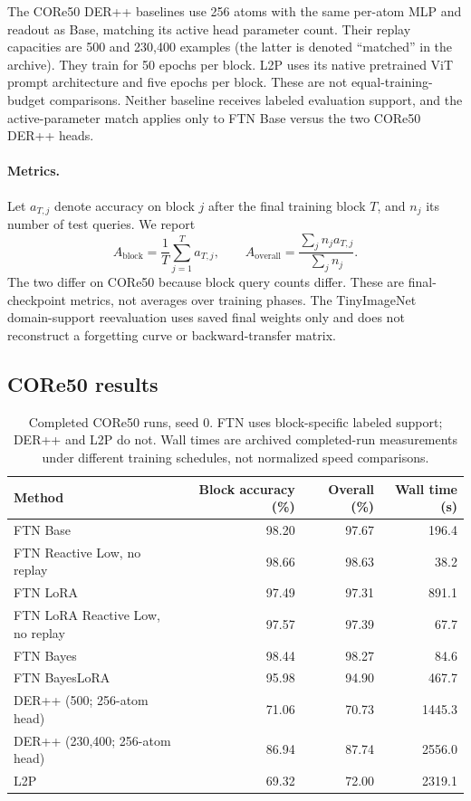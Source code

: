 The CORe50 DER++ baselines use 256 atoms with the same per-atom MLP and readout as Base, matching its active head parameter count. Their replay capacities are 500 and 230,400 examples (the latter is denoted ``matched'' in the archive). They train for 50 epochs per block. L2P uses its native pretrained ViT prompt architecture and five epochs per block. These are not equal-training-budget comparisons. Neither baseline receives labeled evaluation support, and the active-parameter match applies only to FTN Base versus the two CORe50 DER++ heads.

\paragraph{Metrics.}
Let $a_{T,j}$ denote accuracy on block $j$ after the final training block $T$, and $n_j$ its number of test queries. We report
\begin{equation}
 A_{\mathrm{block}}=\frac{1}{T}\sum_{j=1}^{T}a_{T,j},\qquad
 A_{\mathrm{overall}}=\frac{\sum_j n_j a_{T,j}}{\sum_j n_j}.
\end{equation}
The two differ on CORe50 because block query counts differ. These are final-checkpoint metrics, not averages over training phases. The TinyImageNet domain-support reevaluation uses saved final weights only and does not reconstruct a forgetting curve or backward-transfer matrix.

\subsection{CORe50 results}
\begin{table}[htbp]
\centering\small
\begin{tabular}{lrrr}\toprule
Method & Block accuracy (\%) & Overall (\%) & Wall time (s)\\\midrule
FTN Base &98.20&97.67&196.4\\
FTN Reactive Low, no replay &98.66&98.63&38.2\\
FTN LoRA &97.49&97.31&891.1\\
FTN LoRA Reactive Low, no replay &97.57&97.39&67.7\\
FTN Bayes &98.44&98.27&84.6\\
FTN BayesLoRA &95.98&94.90&467.7\\\midrule
DER++ (500; 256-atom head)&71.06&70.73&1445.3\\
DER++ (230,400; 256-atom head)&86.94&87.74&2556.0\\
L2P &69.32&72.00&2319.1\\\bottomrule
\end{tabular}
\caption{Completed CORe50 runs, seed 0. FTN uses block-specific labeled support; DER++ and L2P do not. Wall times are archived completed-run measurements under different training schedules, not normalized speed comparisons.}\label{tab:benchmarking_core50}
\end{table}

